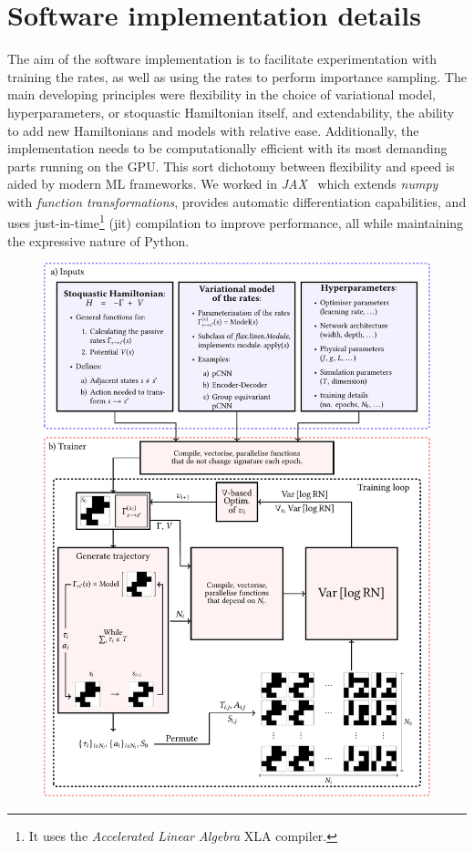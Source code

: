 \section{Software implementation details}
\label{sec:qoptsampl}
The aim of the software implementation is to facilitate experimentation with training the rates, as well as using the rates to perform importance sampling. The main developing principles were flexibility in the choice of variational model, hyperparameters, or stoquastic Hamiltonian itself, and extendability, the ability to add new Hamiltonians and models with relative ease. Additionally, the implementation needs to be computationally efficient with its most demanding parts running on the GPU. This sort dichotomy between flexibility and speed is aided by modern ML frameworks. We worked in \emph{JAX}~\cite{jax2018github} which extends \emph{numpy} with \emph{function transformations}, provides automatic differentiation capabilities, and uses just-in-time\footnote{It uses the \emph{Accelerated Linear Algebra} XLA compiler.} (jit) compilation to improve performance, all while maintaining the expressive nature of Python. 
\begin{figure}[H]
	\centering
	\includegraphics[width=\linewidth]{Chapter4/Figs/Vector/qsampl1}
\end{figure}
